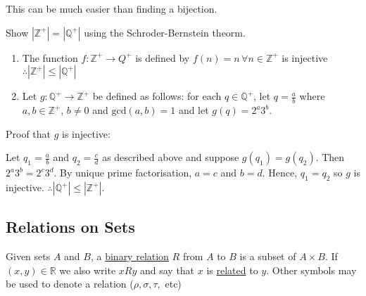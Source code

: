 This can be much easier than finding a bijection.

\begin{example}
    Show $|\mathbb Z^+| = |\mathbb Q^+|$ using the Schroder-Bernstein theorm.

    \begin{enumerate}
        \item The function $f:\mathbb Z^+ \rightarrow Q^+$ is defined by $f(n) = n\,\forall n\in\mathbb Z^+$ is injective $\therefore |\mathbb Z^+| \leq |\mathbb Q^+|$
        \item Let $g:\mathbb Q^+ \rightarrow \mathbb Z^+$ be defined as follows: for each $q\in\mathbb Q^+$, let $q = \frac{a}{b}$ where $a,b\in\mathbb Z^+$, $b\neq 0$ and $\text{gcd}(a,b)= 1$ and let $g(q) = 2^a 3^b$.
    \end{enumerate}

    Proof that $g$ is injective:

    Let $q_1 = \frac{a}{b}$ and $q_2 = \frac{c}{d}$ as described above and suppose $g(q_1) = g(q_2)$. Then $2^a 3^b = 2^c 3^d$. By unique prime factorisation, $a=c$ and $b=d$. Hence, $q_1=q_2$ so $g$ is injective. $\therefore |\mathbb Q^+| \leq |\mathbb Z^+|$.
\end{example}

\subsection{Relations on Sets}
\begin{definition}
    Given sets $A$ and $B$, a \underline{binary relation} $R$ from $A$ to $B$ is a subset of $A\times B$. If $(x,y)\in\mathbb R$ we also write $xRy$ and say that $x$ is \underline{related} to $y$. Other symbols may be used to denote a relation ($\rho, \sigma, \tau,$ etc)
\end{definition}

